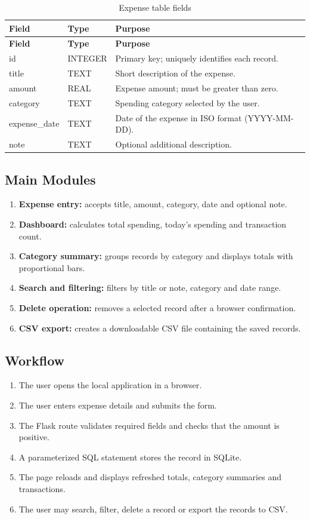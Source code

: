 \documentclass[11pt,a4paper]{report}
\begin{document}
\begin{longtable}{|p{3.2cm}|p{2.4cm}|p{7.0cm}|}
\caption{Expense table fields}\\\hline
\textbf{Field} & \textbf{Type} & \textbf{Purpose}\\\hline
\endfirsthead
\hline \textbf{Field} & \textbf{Type} & \textbf{Purpose}\\\hline
\endhead
id & INTEGER & Primary key; uniquely identifies each record.\\\hline
title & TEXT & Short description of the expense.\\\hline
amount & REAL & Expense amount; must be greater than zero.\\\hline
category & TEXT & Spending category selected by the user.\\\hline
expense\_date & TEXT & Date of the expense in ISO format (YYYY-MM-DD).\\\hline
note & TEXT & Optional additional description.\\\hline
\end{longtable}

\subsection{Main Modules}
\begin{enumerate}[leftmargin=*]
\item \textbf{Expense entry:} accepts title, amount, category, date and optional note.
\item \textbf{Dashboard:} calculates total spending, today's spending and transaction count.
\item \textbf{Category summary:} groups records by category and displays totals with proportional bars.
\item \textbf{Search and filtering:} filters by title or note, category and date range.
\item \textbf{Delete operation:} removes a selected record after a browser confirmation.
\item \textbf{CSV export:} creates a downloadable CSV file containing the saved records.
\end{enumerate}

\subsection{Workflow}
\begin{enumerate}[leftmargin=*]
\item The user opens the local application in a browser.
\item The user enters expense details and submits the form.
\item The Flask route validates required fields and checks that the amount is positive.
\item A parameterized SQL statement stores the record in SQLite.
\item The page reloads and displays refreshed totals, category summaries and transactions.
\item The user may search, filter, delete a record or export the records to CSV.
\end{enumerate}
\end{document}
